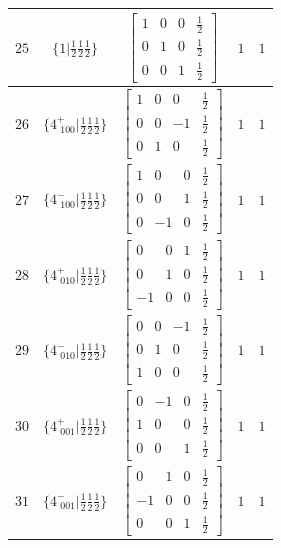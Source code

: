 \documentclass[fleqn,8pt]{jsarticle}
\begin{document}
\begin{longtable}{ccccc}
$ 25 $ & $ \{1|\frac{1}{2} \frac{1}{2} \frac{1}{2}\} $ & $ \begin{bmatrix} 1 & 0 & 0 & \frac{1}{2} \\ 0 & 1 & 0 & \frac{1}{2} \\ 0 & 0 & 1 & \frac{1}{2} \end{bmatrix} $ & $ 1 $ & $ 1 $ \\ \hline
$ 26 $ & $ \{4^{+}_{\,\,100}|\frac{1}{2} \frac{1}{2} \frac{1}{2}\} $ & $ \begin{bmatrix} 1 & 0 & 0 & \frac{1}{2} \\ 0 & 0 & -1 & \frac{1}{2} \\ 0 & 1 & 0 & \frac{1}{2} \end{bmatrix} $ & $ 1 $ & $ 1 $ \\ \hline
$ 27 $ & $ \{4^{-}_{\,\,100}|\frac{1}{2} \frac{1}{2} \frac{1}{2}\} $ & $ \begin{bmatrix} 1 & 0 & 0 & \frac{1}{2} \\ 0 & 0 & 1 & \frac{1}{2} \\ 0 & -1 & 0 & \frac{1}{2} \end{bmatrix} $ & $ 1 $ & $ 1 $ \\ \hline
$ 28 $ & $ \{4^{+}_{\,\,010}|\frac{1}{2} \frac{1}{2} \frac{1}{2}\} $ & $ \begin{bmatrix} 0 & 0 & 1 & \frac{1}{2} \\ 0 & 1 & 0 & \frac{1}{2} \\ -1 & 0 & 0 & \frac{1}{2} \end{bmatrix} $ & $ 1 $ & $ 1 $ \\ \hline
$ 29 $ & $ \{4^{-}_{\,\,010}|\frac{1}{2} \frac{1}{2} \frac{1}{2}\} $ & $ \begin{bmatrix} 0 & 0 & -1 & \frac{1}{2} \\ 0 & 1 & 0 & \frac{1}{2} \\ 1 & 0 & 0 & \frac{1}{2} \end{bmatrix} $ & $ 1 $ & $ 1 $ \\ \hline
$ 30 $ & $ \{4^{+}_{\,\,001}|\frac{1}{2} \frac{1}{2} \frac{1}{2}\} $ & $ \begin{bmatrix} 0 & -1 & 0 & \frac{1}{2} \\ 1 & 0 & 0 & \frac{1}{2} \\ 0 & 0 & 1 & \frac{1}{2} \end{bmatrix} $ & $ 1 $ & $ 1 $ \\ \hline
$ 31 $ & $ \{4^{-}_{\,\,001}|\frac{1}{2} \frac{1}{2} \frac{1}{2}\} $ & $ \begin{bmatrix} 0 & 1 & 0 & \frac{1}{2} \\ -1 & 0 & 0 & \frac{1}{2} \\ 0 & 0 & 1 & \frac{1}{2} \end{bmatrix} $ & $ 1 $ & $ 1 $ \\ \hline

\end{longtable}
\end{document}
